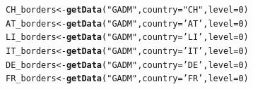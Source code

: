\documentclass{article}\usepackage[]{graphicx}\usepackage[]{color}
\makeatletter
\newcommand{\hlnum}[1]{\textcolor[rgb]{0.686,0.059,0.569}{#1}}%
\newcommand{\hlstr}[1]{\textcolor[rgb]{0.192,0.494,0.8}{#1}}%
\newcommand{\hlstd}[1]{\textcolor[rgb]{0.345,0.345,0.345}{#1}}%
\newcommand{\hlkwb}[1]{\textcolor[rgb]{0.69,0.353,0.396}{#1}}%
\newcommand{\hlkwc}[1]{\textcolor[rgb]{0.333,0.667,0.333}{#1}}%
\newcommand{\hlkwd}[1]{\textcolor[rgb]{0.737,0.353,0.396}{\textbf{#1}}}%
\newenvironment{kframe}{%
 \def\at@end@of@kframe{}%
 \ifinner\ifhmode%
  \def\at@end@of@kframe{\end{minipage}}%
  \begin{minipage}{\columnwidth}%
 \fi\fi%
 \def\FrameCommand##1{\hskip\@totalleftmargin \hskip-\fboxsep
 \colorbox{shadecolor}{##1}\hskip-\fboxsep
     \hskip-\linewidth \hskip-\@totalleftmargin \hskip\columnwidth}%
 \MakeFramed {\advance\hsize-\width
   \@totalleftmargin\z@ \linewidth\hsize
   \@setminipage}}%
 {\par\unskip\endMakeFramed%
 \at@end@of@kframe}
\newenvironment{knitrout}{}{} %
\makeatother
\begin{document}
\begin{knitrout}
\begin{kframe}
\begin{alltt}
\hlstd{CH_borders} \hlkwb{<-} \hlkwd{getData}\hlstd{(}\hlstr{"GADM"}\hlstd{,} \hlkwc{country}\hlstd{=}\hlstr{"CH"}\hlstd{,} \hlkwc{level}\hlstd{=}\hlnum{0} \hlstd{)}
\hlstd{AT_borders} \hlkwb{<-} \hlkwd{getData}\hlstd{(}\hlstr{"GADM"}\hlstd{,} \hlkwc{country}\hlstd{=}\hlstr{'AT'}\hlstd{,} \hlkwc{level}\hlstd{=}\hlnum{0}\hlstd{)}
\hlstd{LI_borders} \hlkwb{<-} \hlkwd{getData}\hlstd{(}\hlstr{"GADM"}\hlstd{,} \hlkwc{country}\hlstd{=}\hlstr{'LI'}\hlstd{,} \hlkwc{level}\hlstd{=}\hlnum{0}\hlstd{)}
\hlstd{IT_borders} \hlkwb{<-} \hlkwd{getData}\hlstd{(}\hlstr{"GADM"}\hlstd{,} \hlkwc{country}\hlstd{=}\hlstr{'IT'}\hlstd{,} \hlkwc{level}\hlstd{=}\hlnum{0}\hlstd{)}
\hlstd{DE_borders} \hlkwb{<-} \hlkwd{getData}\hlstd{(}\hlstr{"GADM"}\hlstd{,} \hlkwc{country}\hlstd{=}\hlstr{'DE'}\hlstd{,} \hlkwc{level}\hlstd{=}\hlnum{0}\hlstd{)}
\hlstd{FR_borders} \hlkwb{<-} \hlkwd{getData}\hlstd{(}\hlstr{"GADM"}\hlstd{,} \hlkwc{country}\hlstd{=}\hlstr{'FR'}\hlstd{,} \hlkwc{level}\hlstd{=}\hlnum{0}\hlstd{)}
\end{alltt}
\end{kframe}
\end{knitrout}
\end{document}
